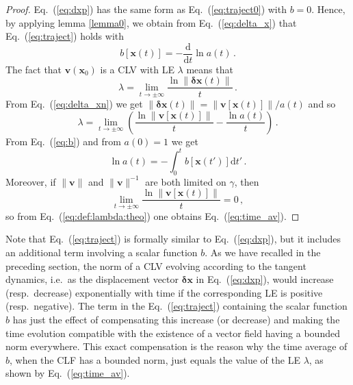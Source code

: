 \documentclass{article}
\theoremstyle{plain}
\theoremstyle{definition}
\theoremstyle{remark}
\newcommand{\vect}[1]{\boldsymbol{#1}}
\begin{document}
\begin{proof}
Eq.~(\ref{eq:dxp}) has the same form as Eq.~(\ref{eq:traject0}) with $b=0$.
Hence, by applying lemma \ref{lemma0}, we obtain from Eq.~(\ref{eq:delta_x}) 
  that Eq.~(\ref{eq:traject}) holds with
  \begin{equation}\label{eq:b}
    b\left[\vect{x}(t)\right]= 
    -\frac{\mathrm{d}}{\mathrm{d}t}\ln a(t)\, .
  \end{equation}
  The fact that $\vect{v}(\vect{x}_0)$ is a CLV with LE $\lambda$
  means that
\[
\lambda =\lim_{t\to \pm\infty} \frac{\ln \lVert \vect{\delta x}(t) \rVert}{t}\,.
\]
From Eq.~(\ref{eq:delta_xn}) we get $ \lVert \vect{\delta x}(t) \rVert=
\lVert \vect{v}\left[\vect{x}(t)\right]\rVert/a(t)$ and so
     \begin{equation}\label{eq:def:lambda:theo}
    \lambda =\lim_{t\to \pm\infty}\left(
    \frac{\ln \lVert \vect{v}\left[\vect {x}(t)\right] \rVert} {t} 
-\frac{\ln a(t)}{t}\right) \, .
  \end{equation}
  From Eq.~(\ref{eq:b}) and from $a(0)=1$ we get
  \begin{equation}\label{eq:sol_cauchy}
    \ln a(t)=-\int_0^t b\left[\vect{x}(t')\right]
        {\mathrm{d}}t' \, .
  \end{equation}  
  Moreover, if  $\lVert
  \vect{v}\rVert$ and $\lVert \vect{v}\rVert^{-1}$ are both limited on
  $\gamma$, then
  \[
  \lim_{t\to \pm\infty}\frac{\ln \lVert \vect{v}\left[\vect {x}(t)\right] \rVert}{t}=0\,,
  \]
so from Eq.~(\ref{eq:def:lambda:theo}) one obtains Eq.~(\ref{eq:time_av}).
\end{proof}

Note that Eq.~(\ref{eq:traject}) is formally similar to Eq.~(\ref{eq:dxp}), but it
includes an additional term involving a scalar function $b$.
As we have recalled in the preceding section,
the norm of a CLV evolving according to the tangent dynamics, 
i.e.\ as the displacement vector $\vect{\delta x}$ in Eq.~(\ref{eq:dxp}),
would increase (resp.\ decrease) exponentially with time if
the corresponding LE is positive (resp.\ negative). 
The term in the Eq.~(\ref{eq:traject}) containing
the scalar function $b$ has just the effect of compensating this increase (or decrease)
and making the time evolution compatible with the existence of a vector field
having a bounded norm everywhere. This exact compensation is the reason why
the time average of $b$, when the CLF has a bounded norm, just equals the value
of the LE $\lambda$, as shown by Eq.~(\ref{eq:time_av}). 
\end{document}

